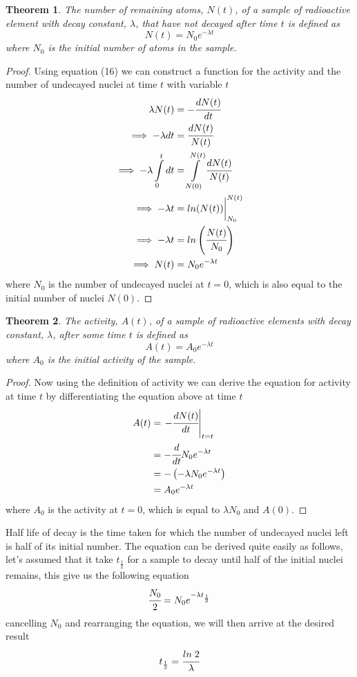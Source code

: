 \documentclass{article}
\newtheorem{theorem}{Theorem}[subsection]
\begin{document}
\begin{theorem}
The number of remaining atoms, $N(t)$, of a sample of radioactive element with decay constant, $\lambda$, that have not decayed after time $t$ is defined as 
$$N(t)=N_0e^{-\lambda t}$$
where $N_0$ is the initial number of atoms in the sample.
\end{theorem}
\begin{proof}
Using equation (16) we can construct a function for the activity and the number of undecayed nuclei at time $t$ with variable $t$
\begin{align*}
    \lambda N(t)&=-\cfrac{dN(t)}{dt} \\ \implies  -\lambda dt &= \cfrac{dN(t)}{N(t)} \\ \implies  -\lambda \int \limits_0^t dt&=\int \limits_{N(0)}^{N(t)}\cfrac{dN(t)}{N(t)} \\ \implies -\lambda t&= ln (N(t))\bigg|_{N_0}^{N(t)} \\ \implies -\lambda t&=ln\left(\cfrac{N(t)}{N_0}\right) \\ \implies N(t)&=N_0e^{-\lambda t}
\end{align*}
where $N_0$ is the number of undecayed nuclei at $t=0$, which is also equal to the initial number of nuclei $N(0)$.
\end{proof}

\begin{theorem}
The activity, $A(t)$, of a sample of radioactive elements with decay constant, $\lambda$, after some time $t$ is defined as 
$$A(t)=A_0e^{-\lambda t}$$
where $A_0$ is the initial activity of the sample.
\end{theorem}
\begin{proof}
Now using the definition of activity we can derive the equation for activity at time $t$ by differentiating the equation above at time $t$
\begin{align*}
    A(t)&=\left.-\cfrac{dN(t)}{dt}\right|_{t=t} \\ &= -\cfrac{d}{dt}N_0e^{-\lambda t} \\  &= -\left(-\lambda N_0e^{-\lambda t}\right) \\ &= A_0e^{-\lambda t}
\end{align*}
where $A_0$ is the activity at $t=0$, which is equal to $\lambda N_0$ and $A(0)$. 
 \end{proof}
 Half life of decay is the time taken for which the number of undecayed nuclei left is half of its initial number. The equation can be derived quite easily as follows, let's assumed that it take $t_{\frac{1}{2}}$ for a sample to decay until half of the initial nuclei remains, this give us the following equation
 $$\cfrac{N_0}{2}=N_0e^{-\lambda t_{\frac{1}{2}}}$$
 cancelling $N_0$ and rearranging the equation, we will then arrive at the desired result
 $$t_{\frac{1}{2}}=\cfrac{ln\;2}{\lambda}$$
 
\end{document}
